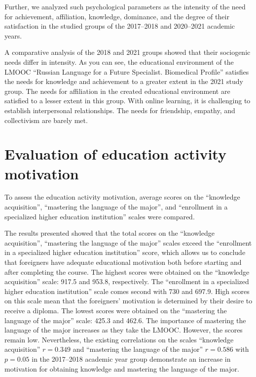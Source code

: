 \documentclass[english]{textolivre}
\begin{document}
Further, we analyzed such psychological parameters as the intensity of the need for achievement, affiliation, knowledge, dominance, and the degree of their satisfaction in the studied groups of the 2017–2018 and 2020–2021 academic years.

A comparative analysis of the 2018 and 2021 groups showed that their sociogenic needs differ in intensity. As you can see, the educational environment of the LMOOC “Russian Language for a Future Specialist. Biomedical Profile” satisfies the needs for knowledge and achievement to a greater extent in the 2021 study group. The needs for affiliation in the created educational environment are satisfied to a lesser extent in this group. With online learning, it is challenging to establish interpersonal relationships. The needs for friendship, empathy, and collectivism are barely met.

\section{Evaluation of education activity motivation}\label{sec-autores}
To assess the education activity motivation, average scores on the “knowledge acquisition”, “mastering the language of the major”, and “enrollment in a specialized higher education institution” scales were compared. 

The results presented showed that the total scores on the “knowledge acquisition”, “mastering the language of the major” scales exceed the “enrollment in a specialized higher education institution” score, which allows us to conclude that foreigners have adequate educational motivation both before starting and after completing the course. The highest scores were obtained on the “knowledge acquisition” scale: 917.5 and 953.8, respectively. The “enrollment in a specialized higher education institution” scale comes second with 730 and 697.9. High scores on this scale mean that the foreigners’ motivation is determined by their desire to receive a diploma. The lowest scores were obtained on the “mastering the language of the major” scale: 425.3 and 462.6. The importance of mastering the language of the major increases as they take the LMOOC. However, the scores remain low. Nevertheless, the existing correlations on the scales “knowledge acquisition” $r = 0.349$ and “mastering the language of the major” $r = 0.586$ with $p = 0.05$ in the 2017–2018 academic year group demonstrate an increase in motivation for obtaining knowledge and mastering the language of the major.
\end{document}
